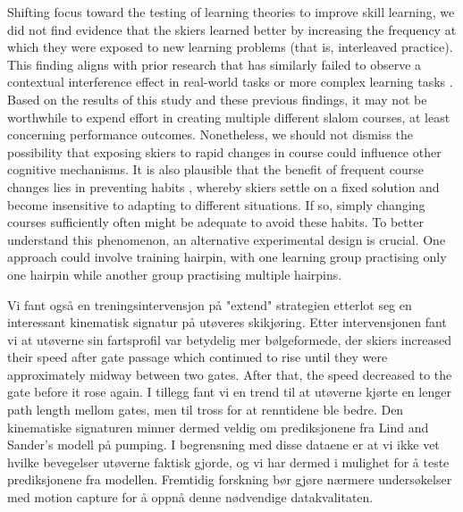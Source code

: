 Shifting focus toward the testing of learning theories to improve skill learning, we did not find evidence that the skiers learned better by increasing the frequency at which they were exposed to new learning problems (that is, interleaved practice). This finding aligns with prior research that has similarly failed to observe a contextual interference effect in real-world tasks or more complex learning tasks \cite{brady_theoretical_1998, barreiros_contextual_2007, wulf_principles_2002}. Based on the results of this study and these previous findings, it may not be worthwhile to expend effort in creating multiple different slalom courses, at least concerning performance outcomes. Nonetheless, we should not dismiss the possibility that exposing skiers to rapid changes in course could influence other cognitive mechanisms. It is also plausible that the benefit of frequent course changes lies in preventing habits \cite{du_relationship_2022}, whereby skiers settle on a fixed solution and become insensitive to adapting to different situations. If so, simply changing courses sufficiently often might be adequate to avoid these habits. To better understand this phenomenon, an alternative experimental design is crucial. One approach could involve training hairpin, with one learning group practising only one hairpin while another group practising multiple hairpins.


 














Vi fant også en treningsintervensjon på "extend" strategien etterlot seg en interessant kinematisk signatur på utøveres skikjøring. Etter intervensjonen fant vi at utøverne sin fartsprofil var betydelig mer bølgeformede, der skiers increased their speed after gate passage which continued to rise until they were approximately midway between two gates. After that, the speed decreased to the gate before it rose again. I tillegg fant vi en trend til at utøverne kjørte en lenger path length mellom gates, men til tross for at renntidene ble bedre. Den kinematiske signaturen minner dermed veldig om prediksjonene fra Lind and Sander's modell på pumping. I begrensning med disse dataene er at vi ikke vet hvilke bevegelser utøverne faktisk gjorde, og vi har dermed i mulighet for å teste prediksjonene fra modellen. Fremtidig forskning bør gjøre nærmere undersøkelser med motion capture for å oppnå denne nødvendige datakvalitaten.















